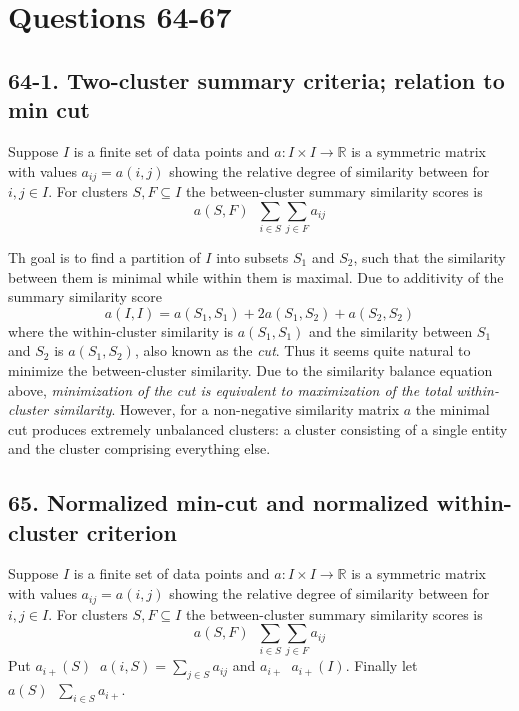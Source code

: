 \documentclass[a4paper]{article}
\newcommand{\Real}{\mathbb{R}}
\newcommand{\defn}{\mathop{\overset{\Delta}{=}}\nolimits}
\begin{document}


\section*{Questions 64-67} %
\label{sec:questions_64_67}

\subsection*{64-1. Two-cluster summary criteria; relation to min cut} %
\label{sub:queston_64_1}
Suppose $I$ is a finite set of data points and  $a:I\times I \to \Real$ is a symmetric matrix with values $a_{ij} = a(i,j)$ showing the relative degree of similarity between for $i,j\in I$. For clusters $S,F\subseteq I$ the between-cluster summary similarity scores is \[a(S,F)\defn \sum_{i\in S}\sum_{j\in F} a_{ij}\]

Th goal is to find a partition of $I$ into subsets $S_1$ and $S_2$, such that the similarity between them is minimal while within them is maximal. Due to additivity of the summary similarity score \[a(I,I) = a(S_1,S_1) + 2 a(S_1,S_2) + a(S_2,S_2)\] where the within-cluster similarity is $a(S_1,S_1)$ and the similarity between $S_1$ and $S_2$ is $a(S_1,S_2)$, also known as the \emph{cut}. Thus it seems quite natural to minimize the between-cluster similarity. Due to the similarity balance equation above, \emph{minimization of the cut is equivalent to maximization of the total within-cluster similarity}. However, for a non-negative similarity matrix $a$ the minimal cut produces extremely unbalanced clusters: a cluster consisting of a single entity and the cluster comprising everything else.


\subsection*{65. Normalized min-cut and normalized within-cluster criterion} %
\label{sub:question_65}
Suppose $I$ is a finite set of data points and $a:I\times I \to \Real$ is a symmetric matrix with values $a_{ij} = a(i,j)$ showing the relative degree of similarity between for $i,j\in I$. For clusters $S,F\subseteq I$ the between-cluster summary similarity scores is \[a(S,F)\defn \sum_{i\in S}\sum_{j\in F} a_{ij}\] Put $a_{i+}(S)\defn a(i,S) = \sum_{j\in S} a_{ij}$ and $a_{i+} \defn a_{i+}(I)$. Finally let $a(S) \defn \sum_{i\in S} a_{i+}$.
\end{document}
